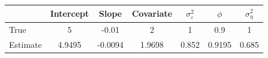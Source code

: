 \begin{tabular}{lcccccc}
\toprule
& Intercept & Slope & Covariate & $\sigma_\varepsilon^2$ & $\phi$ & $\sigma_\eta^2$ \\
\midrule
True & 5 & -0.01 & 2 & 1 & 0.9 & 1 \\
Estimate & 4.9495 & -0.0094 & 1.9698 & 0.852 & 0.9195 & 0.685 \\
\bottomrule
\end{tabular}
